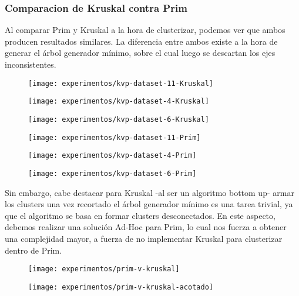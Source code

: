 \subsubsection{Comparacion de Kruskal contra Prim}

Al comparar Prim y Kruskal a la hora de clusterizar, podemos ver que ambos producen resultados similares. La diferencia entre ambos existe a la hora de generar el árbol generador mínimo, sobre el cual luego se descartan los ejes inconsistentes.

\begin{figure}[H]
	\centering
	\begin{minipage}[t]{.3\textwidth}
		\centering
		\texttt{[image: experimentos/kvp-dataset-11-Kruskal]}
	\end{minipage}\qquad
	\begin{minipage}[t]{.3\textwidth}
		\centering
		\texttt{[image: experimentos/kvp-dataset-4-Kruskal]}
	\end{minipage}\qquad
	\begin{minipage}[t]{.3\textwidth}
		\centering
		\texttt{[image: experimentos/kvp-dataset-6-Kruskal]}
	\end{minipage}
\end{figure}	

\begin{figure}[H]
	\centering
	\begin{minipage}[t]{.3\textwidth}
		\centering
		\texttt{[image: experimentos/kvp-dataset-11-Prim]}
	\end{minipage}\qquad
	\begin{minipage}[t]{.3\textwidth}
		\centering
		\texttt{[image: experimentos/kvp-dataset-4-Prim]}
	\end{minipage}\qquad
	\begin{minipage}[t]{.3\textwidth}
		\centering
		\texttt{[image: experimentos/kvp-dataset-6-Prim]}
	\end{minipage}
\end{figure}	


Sin embargo, cabe destacar para Kruskal -al ser un algoritmo bottom up- armar los clusters una vez recortado el árbol generador mínimo es una tarea trivial, ya que el algoritmo se basa en formar clusters desconectados. En este aspecto, debemos realizar una solución Ad-Hoc para Prim, lo cual nos fuerza a obtener una complejidad mayor, a fuerza de no implementar Kruskal para clusterizar dentro de Prim.

\begin{figure}[H]
	\centering
	\begin{minipage}[t]{.45\textwidth}
		\centering
		\texttt{[image: experimentos/prim-v-kruskal]}
	\end{minipage}\qquad
	\begin{minipage}[t]{.45\textwidth}
		\centering
		\texttt{[image: experimentos/prim-v-kruskal-acotado]}
	\end{minipage}
\end{figure}	
